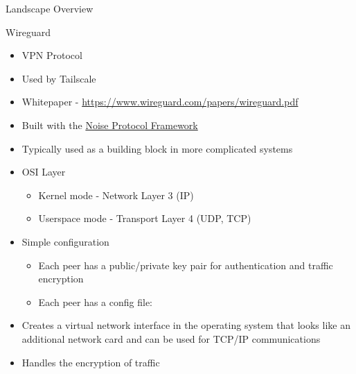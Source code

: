 \begin{frame}[fragile]{Landscape Overview}
\begin{block}{Wireguard}
\protect\hypertarget{wireguard}{}
\begin{itemize}
\tightlist
\item
  VPN Protocol
\item
  Used by Tailscale
\item
  Whitepaper - \url{https://www.wireguard.com/papers/wireguard.pdf}
\item
  Built with the \href{notes/0204-noise}{Noise Protocol Framework}
\item
  Typically used as a building block in more complicated systems
\item
  OSI Layer

  \begin{itemize}
  \tightlist
  \item
    Kernel mode - Network Layer 3 (IP)
  \item
    Userspace mode - Transport Layer 4 (UDP, TCP)
  \end{itemize}
\item
  Simple configuration

  \begin{itemize}
  \item
    Each peer has a public/private key pair for authentication and
    traffic encryption
  \item
    Each peer has a config file:

\begin{Shaded}
\begin{Highlighting}[]
\KeywordTok{[}\KeywordTok{]}
 \OperatorTok{=} \ErrorTok{/}
 \OperatorTok{=} 
 \OperatorTok{=} \OperatorTok{=}

\KeywordTok{[}\KeywordTok{]}
 \OperatorTok{=} \ErrorTok{+}\ErrorTok{+}\ErrorTok{/}\ErrorTok{+}\OperatorTok{=}
 \OperatorTok{=} \ErrorTok{/}
 \OperatorTok{=} \ErrorTok{:}
 \OperatorTok{=} 
\end{Highlighting}
\end{Shaded}
  \end{itemize}
\item
  Creates a virtual network interface in the operating system that looks
  like an additional network card and can be used for TCP/IP
  communications
\item
  Handles the encryption of traffic


\end{itemize}
\end{block}
\end{frame}
